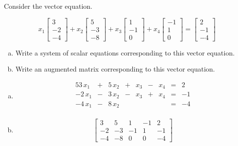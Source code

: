 
\begin{exerciseStatement}


Consider the vector equation.

\[ x_{1} \left[\begin{array}{c}
3 \\
-2 \\
-4
\end{array}\right] + x_{2} \left[\begin{array}{c}
5 \\
-3 \\
-8
\end{array}\right] + x_{3} \left[\begin{array}{c}
1 \\
-1 \\
0
\end{array}\right] + x_{4} \left[\begin{array}{c}
-1 \\
1 \\
0
\end{array}\right] = \left[\begin{array}{c}
2 \\
-1 \\
-4
\end{array}\right] \]
\begin{enumerate}[(a)]
\item  Write a system of scalar equations corresponding to this vector equation. 
\item  Write an augmented matrix corresponding to this vector equation. 
\end{enumerate}
    
\end{exerciseStatement}
    
\begin{exerciseAnswer} 

\begin{enumerate}[(a)]
\item 
\begin{alignat*}{5} 3 \, x_{1} &+& 5 \, x_{2} &+& x_{3} &-& x_{4} &=& 2 \\-2 \, x_{1} &-& 3 \, x_{2} &-& x_{3} &+& x_{4} &=& -1 \\-4 \, x_{1} &-& 8 \, x_{2} & &  & &  &=& -4 \\ \end{alignat*}
            
\item \[ \left[\begin{array}{cccc|c}
3 & 5 & 1 & -1 & 2 \\
-2 & -3 & -1 & 1 & -1 \\
-4 & -8 & 0 & 0 & -4
\end{array}\right] \]
\end{enumerate}
    
\end{exerciseAnswer}
    
